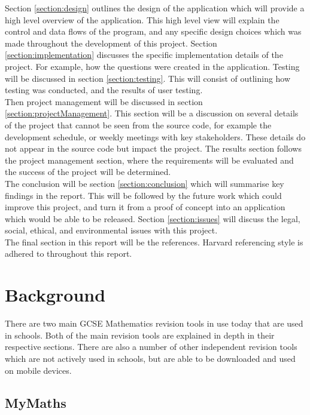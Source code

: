 \documentclass{article}
\begin{document}
Section \ref{section:design} outlines the design of the application which will provide a high level overview of the application. This high level view will explain the control and data flows of the program, and any specific design choices which was made throughout the development of this project. Section \ref{section:implementation} discusses the specific implementation details of the project. For example, how the questions were created in the application. Testing will be discussed in section \ref{section:testing}. This will consist of outlining how testing was conducted, and the results of user testing. \\

Then project management will be discussed in section \ref{section:projectManagement}. This section will be a discussion on several details of the project that cannot be seen from the source code, for example the development schedule, or weekly meetings with key stakeholders. These details do not appear in the source code but impact the project. The results section follows the project management section, where the requirements will be evaluated and the success of the project will be determined. \\

The conclusion will be section \ref{section:conclusion} which will summarise key findings in the report. This will be followed by the future work which could improve this project, and turn it from a proof of concept into an application which would be able to be released. Section \ref{section:issues} will discuss the legal, social, ethical, and environmental issues with this project. \\

The final section in this report will be the references. Harvard referencing style is adhered to throughout this report.\\ 

\section{Background}
\label{section:background}

There are two main GCSE Mathematics revision tools in use today that are used in schools. Both of the main revision tools are explained in depth in their respective sections. There are also a number of other independent revision tools which are not actively used in schools, but are able to be downloaded and used on mobile devices. 

\subsection{MyMaths}
\end{document}
